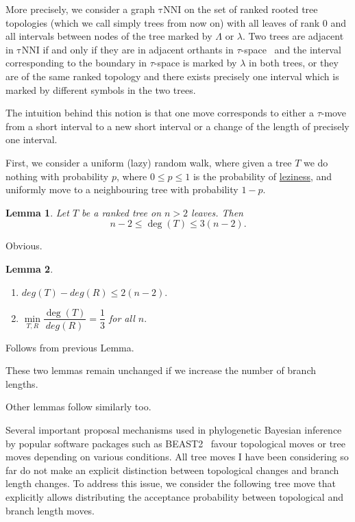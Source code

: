 \documentclass{amsart}
\newtheorem{lemma}{Lemma}
\newcommand{\tN}{\mathrm{\tau NNI}}
\begin{document}
More precisely, we consider a graph $\tN$ on the set of ranked rooted tree 
topologies (which we call simply trees from now on) with all leaves of rank 
$0$ and all intervals between nodes of the tree marked by $\Lambda$ or
$\lambda$. Two trees are adjacent in $\tN$ if and only if they are in 
adjacent orthants in $\tau$-space~\cite{GD} and the interval corresponding 
to the boundary in $\tau$-space is marked by $\lambda$ in both trees, 
or they are of the same ranked topology and there 
exists precisely one interval which is marked by different symbols in 
the two trees. 

The intuition behind this notion is that one move corresponds to either 
a $\tau$-move from a short interval to a new short interval or a change 
of the length of precisely one interval. 

First, we consider a uniform (lazy) random walk, where given a tree $T$ 
we do nothing with probability $p$, where $0\leq p\leq 1$ is the probability of 
\href{https://academichelp.net/wp-content/uploads/2014/01/laziness.jpg}{leziness},
and uniformly move to a neighbouring tree with probability $1-p$. 

\begin{lemma}
Let $T$ be a ranked tree on $n>2$ leaves. Then \[n-2\leq \deg(T)\leq3(n-2).\] 
\end{lemma}

\proof
Obvious.
\endproof

\begin{lemma}
\begin{enumerate}[(1)]
\item $deg(T)-deg(R) \leq 2(n-2).$
\item $\min\limits_{T,R}\dfrac{\deg(T)}{deg(R)} = \dfrac13$ for all $n.$
\end{enumerate}
\end{lemma}

\proof
Follows from previous Lemma. 
\endproof

These two lemmas remain unchanged if we increase the number of branch lengths. 

Other lemmas follow similarly too. 

Several important proposal mechanisms used in phylogenetic Bayesian inference by 
popular software packages such as BEAST2~\cite{beast2} favour topological moves
or tree moves depending on various conditions. All tree moves I have been 
considering so far do not make an explicit distinction between topological 
changes and branch length changes. To address this issue, we consider the
following tree move that explicitly allows distributing the acceptance 
probability between topological and branch length moves. 
\end{document}
